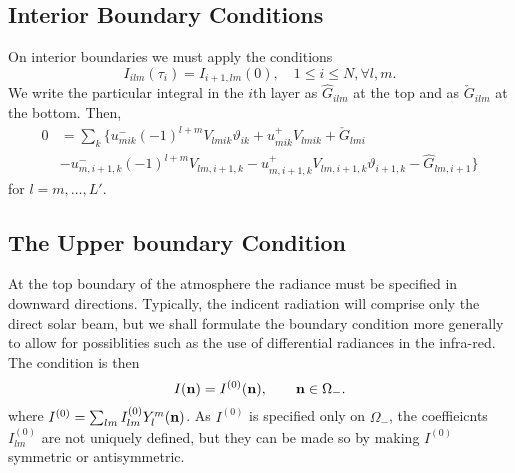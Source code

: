 \subsection{Interior Boundary Conditions}

On interior boundaries we must apply the conditions
\begin{equation}
I_{ilm}(\tau_i) =I_{i+1,lm} (0), \quad 1\leqslant i \leqslant N, \forall l,m.
\end{equation}
We write the particular integral in the $i$th layer as $\hat G_{ilm}$ at the 
top and as $\check G_{ilm}$ at the bottom. Then,
\begin{equation}
\begin{split}
0&=\sum_k \biggl \{ u_{mik}^- (-1)^{l+m} V_{lmik} \vartheta_{ik} 
+ u_{mik}^+ V_{lmik} + \check G_{lmi} \\
& -u_{m,i+1,k}^- (-1)^{l+m} V_{lm,i+1,k} 
- u_{m,i+1,k}^+ V_{lm,i+1,k} \vartheta_{i+1,k} - 
\hat G_{lm,i+1} \biggr \}
\end{split}
\end{equation}
for $l=m,\ldots,L'$.

\subsection{The Upper boundary Condition}

At the top boundary of the atmosphere the radiance must be specified in
downward directions. Typically, the indicent radiation will comprise
only the direct solar beam, but we shall formulate the boundary condition
more generally to allow for possiblities such as the use of 
differential radiances in the infra-red. The condition is then
\begin{equation}
I(\mathbf{n})= I^{(0)} (\mathbf{n}), \qquad \mathbf{n} \in \Omega_-.
\end{equation}
where $I^{(0)}=\sum_{lm} I_{lm}^{(0)} Y_l^m(\mathbf{n})$.
As $I^{(0)}$ is specified only on
$\Omega_-$, the coeffieicnts $I_{lm}^{(0)}$ are not uniquely defined, but
they can be made so by making $I^{(0)}$ symmetric or antisymmetric.

